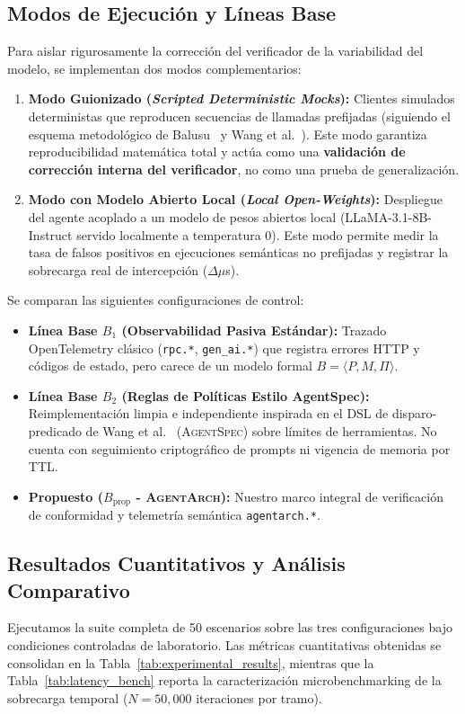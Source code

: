 \documentclass[conference]{IEEEtran}
\begin{document}
\subsection{Modos de Ejecuci\'on y L\'ineas Base}
Para aislar rigurosamente la correcci\'on del verificador de la variabilidad del modelo, se implementan dos modos complementarios:
\begin{enumerate}
    \item \textbf{Modo Guionizado (\emph{Scripted Deterministic Mocks}):} Clientes simulados deterministas que reproducen secuencias de llamadas prefijadas (siguiendo el esquema metodol\'ogico de Balusu~\cite{balusu2026} y Wang et al.~\cite{wangs2026}). Este modo garantiza reproducibilidad matem\'atica total y act\'ua como una \textbf{validaci\'on de correcci\'on interna del verificador}, no como una prueba de generalizaci\'on.
    \item \textbf{Modo con Modelo Abierto Local (\emph{Local Open-Weights}):} Despliegue del agente acoplado a un modelo de pesos abiertos local (LLaMA-3.1-8B-Instruct servido localmente a temperatura 0). Este modo permite medir la tasa de falsos positivos en ejecuciones sem\'anticas no prefijadas y registrar la sobrecarga real de intercepci\'on ($\Delta \mu$s).
\end{enumerate}

Se comparan las siguientes configuraciones de control:
\begin{itemize}
    \item \textbf{L\'inea Base $B_1$ (Observabilidad Pasiva Est\'andar):} Trazado OpenTelemetry cl\'asico (\texttt{rpc.*}, \texttt{gen\_ai.*}) que registra errores HTTP y c\'odigos de estado, pero carece de un modelo formal $B = \langle P, M, \Pi \rangle$.
    \item \textbf{L\'inea Base $B_2$ (Reglas de Pol\'iticas Estilo AgentSpec):} Reimplementaci\'on limpia e independiente inspirada en el DSL de disparo-predicado de Wang et al.~\cite{wangh2026} (\textsc{AgentSpec}) sobre l\'imites de herramientas. No cuenta con seguimiento criptogr\'afico de prompts ni vigencia de memoria por TTL.
    \item \textbf{Propuesto ($B_{\text{prop}}$ - \textsc{AgentArch}):} Nuestro marco integral de verificaci\'on de conformidad y telemetr\'ia sem\'antica \texttt{agentarch.*}.
\end{itemize}

\subsection{Resultados Cuantitativos y An\'alisis Comparativo}
Ejecutamos la suite completa de 50 escenarios sobre las tres configuraciones bajo condiciones controladas de laboratorio. Las m\'etricas cuantitativas obtenidas se consolidan en la Tabla~\ref{tab:experimental_results}, mientras que la Tabla~\ref{tab:latency_bench} reporta la caracterizaci\'on microbenchmarking de la sobrecarga temporal ($N=50,000$ iteraciones por tramo).
\end{document}
